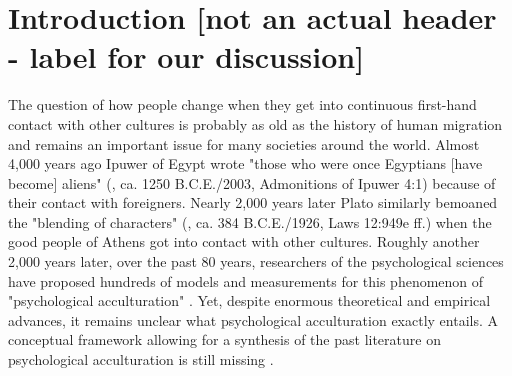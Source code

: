 \documentclass[man, 12pt, a4paper]{apa7}
\begin{document}
%
%
%

\section{Introduction [not an actual header - label for our discussion]}

The question of how people change when they get into continuous first-hand contact with other cultures is probably as old as the history of human migration and remains an important issue for many societies around the world. 
Almost 4,000 years ago Ipuwer of Egypt wrote "those who were once Egyptians [have become] aliens" (\citeauthor{Ipuwer2003}, ca. 1250 B.C.E./2003, Admonitions of Ipuwer 4:1) because of their contact with foreigners. Nearly 2,000 years later Plato similarly bemoaned the "blending of characters" (\citeauthor{Plato1926}, ca. 384 B.C.E./1926, Laws 12:949e ff.) when the good people of Athens got into contact with other cultures. Roughly another 2,000 years later, over the past 80 years, researchers of the psychological sciences have proposed hundreds of models and measurements for this phenomenon of "psychological acculturation" \citep[][]{Rudmin2003a}. Yet, despite enormous theoretical and empirical advances, it remains unclear what psychological acculturation exactly entails. A conceptual framework allowing for a synthesis of the past literature on psychological acculturation is still missing \citep{Birman2014c}.
\end{document}
